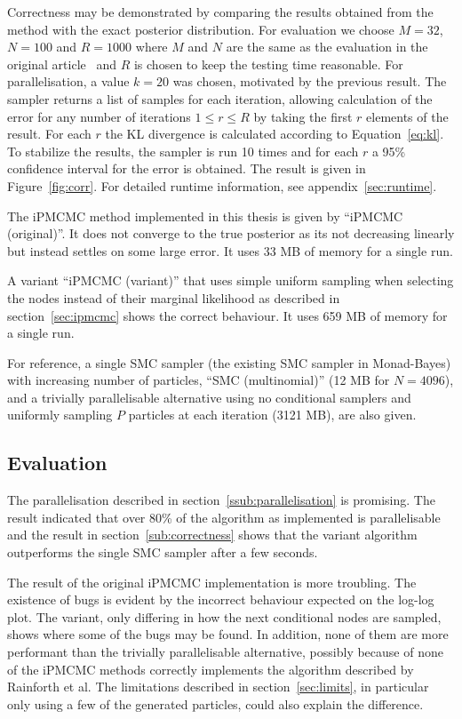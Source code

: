 Correctness may be demonstrated by comparing the results obtained from the method with the exact posterior distribution. For evaluation we choose $M=32$, $N=100$ and $R=1000$ where $M$ and $N$ are the same as the evaluation in the original article~\cite{ipmcmc} and $R$ is chosen to keep the testing time reasonable. For parallelisation, a value $k=20$ was chosen, motivated by the previous result. The sampler returns a list of samples for each iteration, allowing calculation of the error for any number of iterations $1 \leq r \leq R$ by taking the first $r$ elements of the result. For each $r$ the KL divergence is calculated according to Equation~\ref{eq:kl}. To stabilize the results, the sampler is run 10 times and for each $r$ a 95\% confidence interval for the error is obtained. The result is given in Figure~\ref{fig:corr}. For detailed runtime information, see appendix~\ref{sec:runtime}.

The iPMCMC method implemented in this thesis is given by ``iPMCMC (original)''. It does not converge to the true posterior as its not decreasing linearly but instead settles on some large error. It uses 33 MB of memory for a single run.

A variant ``iPMCMC (variant)'' that uses simple uniform sampling when selecting the nodes instead of their marginal likelihood as described in section~\ref{sec:ipmcmc} shows the correct behaviour. It uses 659 MB of memory for a single run.

For reference, a single SMC sampler (the existing SMC sampler in Monad-Bayes) with increasing number of particles, ``SMC (multinomial)'' (12 MB for $N=4096$), and a trivially parallelisable alternative using no conditional samplers and uniformly sampling $P$ particles at each iteration (3121 MB), are also given.

\subsection{Evaluation}

The parallelisation described in section~\ref{ssub:parallelisation} is promising. The result indicated that over 80\% of the algorithm as implemented is parallelisable and the result in section~\ref{sub:correctness} shows that the variant algorithm outperforms the single SMC sampler after a few seconds.

The result of the original iPMCMC implementation is more troubling. The existence of bugs is evident by the incorrect behaviour expected on the log-log plot. The variant, only differing in how the next conditional nodes are sampled, shows where some of the bugs may be found. In addition, none of them are more performant than the trivially parallelisable alternative, possibly because of none of the iPMCMC methods correctly implements the algorithm described by Rainforth et al. The limitations described in section~\ref{sec:limits}, in particular only using a few of the generated particles, could also explain the difference.
